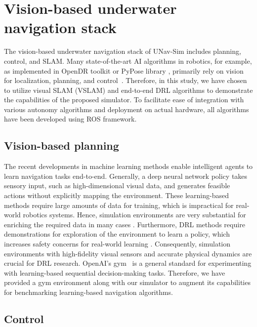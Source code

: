 \section{Vision-based underwater navigation stack}\label{sec:stack}
The vision-based underwater navigation stack of UNav-Sim includes planning, control, and \ac{SLAM}. Many state-of-the-art \ac{AI} algorithms in robotics, for example, as implemented in OpenDR toolkit \cite{opendr} or PyPose library \cite{pypose}, primarily rely on vision for localization, planning, and control~\cite{huy}. Therefore, in this study, we have chosen to utilize visual SLAM (VSLAM) and end-to-end \ac{DRL} algorithms to demonstrate the capabilities of the proposed simulator. To facilitate ease of integration with various autonomy algorithms and deployment on actual hardware, all algorithms have been developed using \ac{ROS} framework.




\subsection{Vision-based planning}
\label{sec:stack:planning}


The recent developments in machine learning methods enable intelligent agents to learn navigation tasks end-to-end. Generally, a deep neural network policy takes sensory input, such as high-dimensional visual data, and generates feasible actions without explicitly mapping the environment. These learning-based methods require large amounts of data for training, which is impractical for real-world robotics systems. Hence, simulation environments are very substantial for enriching the required data in many cases \cite{loquercio2021learning}.
Furthermore, \ac{DRL} methods require demonstrations for exploration of the environment to learn a policy, which increases safety concerns for real-world learning \cite{halil}. 
Consequently, simulation environments with high-fidelity visual sensors and accurate physical dynamics are crucial for DRL research. OpenAI's gym~\cite{gym} is a general standard for experimenting with learning-based sequential decision-making tasks.
Therefore, we have provided a gym environment along with our simulator to augment its capabilities for benchmarking learning-based navigation algorithms.

\subsection{Control}
\label{sec:stack:control}

